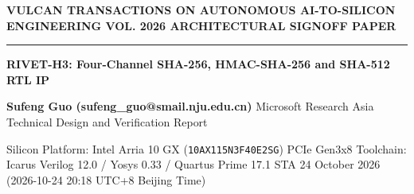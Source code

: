 \documentclass[11pt,a4paper]{article}
\begin{document}
{\scriptsize\sffamily\textcolor{vulcan}{\textbf{VULCAN TRANSACTIONS ON AUTONOMOUS AI-TO-SILICON ENGINEERING \hfill VOL. 2026 \textperiodcentered{} ARCHITECTURAL SIGNOFF PAPER}}\par}

\vspace{1pt}\textcolor{vulcan}{\rule{\textwidth}{1.2pt}}\vspace{4pt}

\begin{center}

{\sffamily\LARGE\bfseries RIVET-H3: Four-Channel SHA-256,\allowbreak{} HMAC-SHA-256 and SHA-512 RTL IP\par}\vspace{3pt}

{\small\sffamily\textbf{Sufeng Guo (\allowbreak{}sufeng\_\allowbreak{}guo@smail.nju.edu.cn)\allowbreak{}} \textperiodcentered{} Microsoft Research Asia \textperiodcentered{} Technical Design and Verification Report\par}\vspace{1pt}

{\scriptsize\sffamily\textcolor{black!75}{Silicon Platform: Intel Arria 10 GX (\texttt{10AX115N3F40E2SG}) PCIe Gen3x8 \textperiodcentered{} Toolchain: Icarus Verilog 12.0 / Yosys 0.33 / Quartus Prime 17.1 STA \textperiodcentered{} 24 October 2026 (\allowbreak{}2026-10-24 20:18 UTC+\allowbreak{}8 Beijing Time)\allowbreak{}}\par}

\end{center}\vspace{2pt}

\renewcommand{\abstractname}{\textcolor{vulcanblue}{Abstract}}\begin{abstract}\noindent RIVET-H3 is a synthesizable cryptographic hashing subsystem with four independently tagged channels,\allowbreak{} streaming message and key inputs,\allowbreak{} portable context save/\allowbreak{}restore,\allowbreak{} and backpressure-safe digest delivery. It preserves the six original RIVET-H2 modules unchanged and adds an iterative SHA-512 datapath to each channel. Independent Icarus verification completed six seeded behavior configurations with 3,\allowbreak{}504 complete digest comparisons and zero mismatches,\allowbreak{} plus 244 compatibility comparisons and 25 cycle-measurement workloads. For 1,\allowbreak{}024-byte messages,\allowbreak{} measured aggregate throughput increased from 0.4171 to 1.2876 bytes/\allowbreak{}cycle for SHA-256,\allowbreak{} from 0.4060 to 1.2611 for HMAC-SHA-256,\allowbreak{} and from 0.5002 to 1.4644 for SHA-512 when moving from one to four active channels. These are simulation-cycle results,\allowbreak{} not physical frequency or implementation measurements.\par{}\end{abstract}\vspace{2pt}
\end{document}
